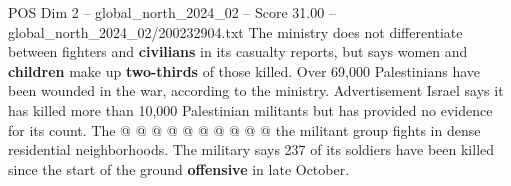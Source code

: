 \begin{textsample}{POS Dim 2 – global\_north\_2024\_02 – Score 31.00 – global\_north\_2024\_02/200232904.txt}
The ministry does not differentiate between fighters and \textbf{civilians} in its casualty reports, but says women and \textbf{children} make up \textbf{two-thirds} of those killed.
Over 69,000 Palestinians have been wounded in the war, according to the ministry.
Advertisement Israel says it has killed more than 10,000 Palestinian militants but has provided no evidence for its count.
The @ @ @ @ @ @ @ @ @ @ the militant group fights in dense residential neighborhoods.
The military says 237 of its soldiers have been killed since the start of the ground \textbf{offensive} in late October.

\end{textsample}
